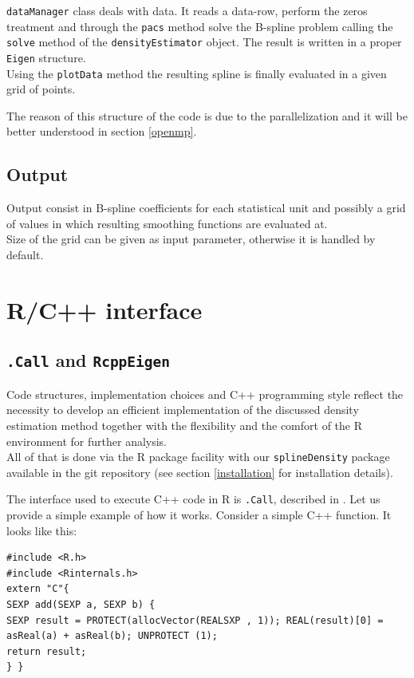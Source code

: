 \verb|dataManager| class deals with data. It reads a data-row, perform the zeros treatment and through the \verb|pacs| method solve the B-spline problem calling the \verb|solve| method of the \verb|densityEstimator| object. The result is written in a proper \verb|Eigen| structure. \\ Using the \verb|plotData| method the resulting spline is finally evaluated in a given grid of points.

The reason of this structure of the code is due to the parallelization and it will be better understood in section \ref{openmp}.

\subsection{Output}
Output consist in B-spline coefficients for each statistical unit and possibly a grid of values in which resulting smoothing functions are evaluated at. \\ Size of the grid can be given as input parameter, otherwise it is handled by default.

\section{R/C++ interface} \label{R}
\subsection{\texttt{.Call} and \texttt{RcppEigen}}
Code structures, implementation choices and C++ programming style reflect the necessity to develop an efficient implementation of the discussed density estimation method together with the flexibility and the comfort of the R environment for further analysis. \\ All of that is done via the R package facility with our \verb|splineDensity| package available in the git repository (see section \ref{installation} for installation details). 

The interface used to execute C++ code in R is \verb|.Call|, described in \cite{manual:rext}. Let us provide a simple example of how it works. Consider a simple C++ function. It looks like this:

\begin{lstlisting}
#include <R.h>
#include <Rinternals.h>
extern "C"{
SEXP add(SEXP a, SEXP b) {
SEXP result = PROTECT(allocVector(REALSXP , 1)); REAL(result)[0] = asReal(a) + asReal(b); UNPROTECT (1);
return result;
} }
\end{lstlisting}


